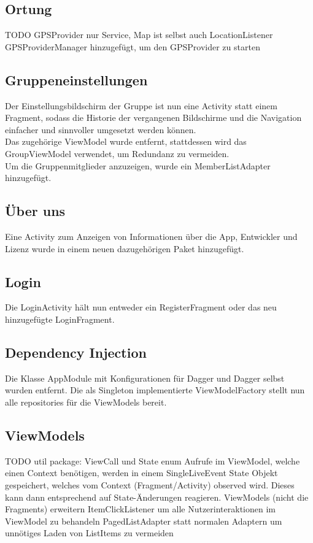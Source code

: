 \documentclass[parskip=full,11pt]{scrartcl}
\begin{document}
\subsection{Ortung}
TODO
GPSProvider nur Service, Map ist selbst auch LocationListener
GPSProviderManager hinzugefügt, um den GPSProvider zu starten

\subsection{Gruppeneinstellungen}
Der Einstellungsbildschirm der Gruppe ist nun eine Activity statt einem
Fragment, sodass die Historie der vergangenen Bildschirme und die
Navigation einfacher und sinnvoller umgesetzt werden können.\\
Das zugehörige ViewModel wurde entfernt, stattdessen wird das
GroupViewModel verwendet, um Redundanz zu vermeiden.\\
Um die Gruppenmitglieder anzuzeigen, wurde ein MemberListAdapter
hinzugefügt.

\subsection{Über uns}
Eine Activity zum Anzeigen von Informationen über die App, Entwickler und
Lizenz wurde in einem neuen dazugehörigen Paket hinzugefügt.

\subsection{Login}
Die LoginActivity hält nun entweder ein RegisterFragment oder das neu
hinzugefügte LoginFragment.

\subsection{Dependency Injection}
Die Klasse AppModule mit Konfigurationen für Dagger und Dagger selbst
wurden entfernt. Die als Singleton implementierte ViewModelFactory stellt
nun alle repositories für die ViewModels bereit.

\subsection{ViewModels}
TODO
util package: ViewCall und State enum
Aufrufe im ViewModel, welche einen Context benötigen, werden in einem SingleLiveEvent State Objekt gespeichert, welches vom Context (Fragment/Activity) observed wird. Dieses kann dann entsprechend auf State-Änderungen reagieren.
ViewModels (nicht die Fragments) erweitern ItemClickListener um alle Nutzerinteraktionen im ViewModel zu behandeln
PagedListAdapter statt normalen Adaptern um unnötiges Laden von ListItems zu vermeiden
\end{document}
